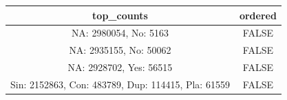 \documentclass[]{book}
\theoremstyle{definition}
\theoremstyle{definition}
\theoremstyle{definition}
\theoremstyle{remark}
\begin{document}
\begin{longtable}[]{@{}cc@{}}
\toprule
\begin{minipage}[b]{0.38\columnwidth}\centering\strut
top\_counts\strut
\end{minipage} & \begin{minipage}[b]{0.12\columnwidth}\centering\strut
ordered\strut
\end{minipage}\tabularnewline
\midrule
\endhead
\begin{minipage}[t]{0.38\columnwidth}\centering\strut
NA: 2980054, No: 5163\strut
\end{minipage} & \begin{minipage}[t]{0.12\columnwidth}\centering\strut
FALSE\strut
\end{minipage}\tabularnewline
\begin{minipage}[t]{0.38\columnwidth}\centering\strut
NA: 2935155, No: 50062\strut
\end{minipage} & \begin{minipage}[t]{0.12\columnwidth}\centering\strut
FALSE\strut
\end{minipage}\tabularnewline
\begin{minipage}[t]{0.38\columnwidth}\centering\strut
NA: 2928702, Yes: 56515\strut
\end{minipage} & \begin{minipage}[t]{0.12\columnwidth}\centering\strut
FALSE\strut
\end{minipage}\tabularnewline
\begin{minipage}[t]{0.38\columnwidth}\centering\strut
Sin: 2152863, Con: 483789, Dup: 114415, Pla: 61559\strut
\end{minipage} & \begin{minipage}[t]{0.12\columnwidth}\centering\strut
FALSE\strut
\end{minipage}\tabularnewline
\bottomrule
\end{longtable}
\end{document}
